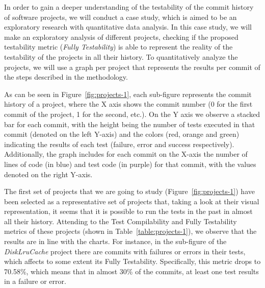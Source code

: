 In order to gain a deeper understanding of the testability of the commit history of software projects, we will conduct a case study, which is aimed to be an exploratory research with quantitative data analysis. 
In this case study, we will make an exploratory analysis of different projects, checking if the proposed testability metric (\textit{Fully Testability}) is able to represent the reality of the testability of the projects in all their history.
To quantitatively analyze the projects, we will use a graph per project that represents the results per commit of the steps described in the methodology. 

As can be seen in Figure~\ref{fig:projects-1}, each sub-figure represents the commit history of a project, where the X axis shows the commit number (0 for the first commit of the project, 1 for the second, etc.). On the Y axis we observe a stacked bar for each commit, with the height being the number of tests executed in that commit (denoted on the left Y-axis) and the colors (red, orange and green) indicating the results of each test (failure, error and success respectively). Additionally, the graph includes for each commit on the X-axis the number of lines of code (in blue) and test code (in purple) for that commit, with the values denoted on the right Y-axis.


The first set of projects that we are going to study (Figure~\ref{fig:projects-1}) have been selected as a representative set of projects that, taking a look at their visual representation, it seems that it is possible to run the tests in the past in almost all their history.
Attending to the Test Compilability and Fully Testability metrics of these projects (shown in Table~\ref{table:projects-1}), we observe that the results are in line with the charts.
For instance, in the sub-figure of the \textit{DiskLruCache} project there are commits with failures or errors in their tests, which affects to some extent its Fully Testability. Specifically, this metric drops to 70.58\%, which means that in almost 30\% of the commits, at least one test results in a failure or error.

